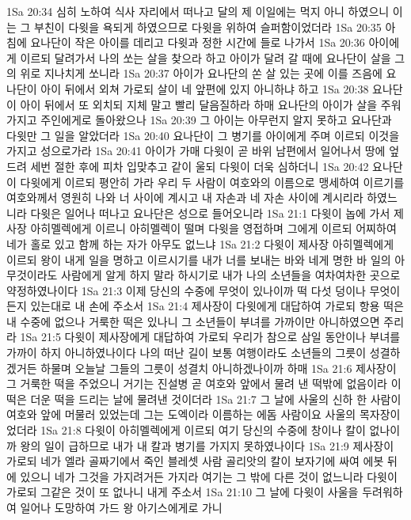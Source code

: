 1Sa 20:34  심히 노하여 식사 자리에서 떠나고 달의 제 이일에는 먹지 아니 하였으니 이는 그 부친이 다윗을 욕되게 하였으므로 다윗을 위하여 슬퍼함이었더라
1Sa 20:35  아침에 요나단이 작은 아이를 데리고 다윗과 정한 시간에 들로 나가서
1Sa 20:36  아이에게 이르되 달려가서 나의 쏘는 살을 찾으라 하고 아이가 달려 갈 때에 요나단이 살을 그의 위로 지나치게 쏘니라
1Sa 20:37  아이가 요나단의 쏜 살 있는 곳에 이를 즈음에 요나단이 아이 뒤에서 외쳐 가로되 살이 네 앞편에 있지 아니하냐 하고
1Sa 20:38  요나단이 아이 뒤에서 또 외치되 지체 말고 빨리 달음질하라 하매 요나단의 아이가 살을 주워가지고 주인에게로 돌아왔으나
1Sa 20:39  그 아이는 아무런지 알지 못하고 요나단과 다윗만 그 일을 알았더라
1Sa 20:40  요나단이 그 병기를 아이에게 주며 이르되 이것을 가지고 성으로가라
1Sa 20:41  아이가 가매 다윗이 곧 바위 남편에서 일어나서 땅에 엎드려 세번 절한 후에 피차 입맞추고 같이 울되 다윗이 더욱 심하더니
1Sa 20:42  요나단이 다윗에게 이르되 평안히 가라 우리 두 사람이 여호와의 이름으로 맹세하여 이르기를 여호와께서 영원히 나와 너 사이에 계시고 내 자손과 네 자손 사이에 계시리라 하였느니라 다윗은 일어나 떠나고 요나단은 성으로 들어오니라
1Sa 21:1  다윗이 놉에 가서 제사장 아히멜렉에게 이르니 아히멜렉이 떨며 다윗을 영접하며 그에게 이르되 어찌하여 네가 홀로 있고 함께 하는 자가 아무도 없느냐
1Sa 21:2  다윗이 제사장 아히멜렉에게 이르되 왕이 내게 일을 명하고 이르시기를 내가 너를 보내는 바와 네게 명한 바 일의 아무것이라도 사람에게 알게 하지 말라 하시기로 내가 나의 소년들을 여차여차한 곳으로 약정하였나이다
1Sa 21:3  이제 당신의 수중에 무엇이 있나이까 떡 다섯 덩이나 무엇이든지 있는대로 내 손에 주소서
1Sa 21:4  제사장이 다윗에게 대답하여 가로되 항용 떡은 내 수중에 없으나 거룩한 떡은 있나니 그 소년들이 부녀를 가까이만 아니하였으면 주리라
1Sa 21:5  다윗이 제사장에게 대답하여 가로되 우리가 참으로 삼일 동안이나 부녀를 가까이 하지 아니하였나이다 나의 떠난 길이 보통 여행이라도 소년들의 그릇이 성결하겠거든 하물며 오늘날 그들의 그릇이 성결치 아니하겠나이까 하매
1Sa 21:6  제사장이 그 거룩한 떡을 주었으니 거기는 진설병 곧 여호와 앞에서 물려 낸 떡밖에 없음이라 이 떡은 더운 떡을 드리는 날에 물려낸 것이더라
1Sa 21:7  그 날에 사울의 신하 한 사람이 여호와 앞에 머물러 있었는데 그는 도엑이라 이름하는 에돔 사람이요 사울의 목자장이었더라
1Sa 21:8  다윗이 아히멜렉에게 이르되 여기 당신의 수중에 창이나 칼이 없나이까 왕의 일이 급하므로 내가 내 칼과 병기를 가지지 못하였나이다
1Sa 21:9  제사장이 가로되 네가 엘라 골짜기에서 죽인 블레셋 사람 골리앗의 칼이 보자기에 싸여 에봇 뒤에 있으니 네가 그것을 가지려거든 가지라 여기는 그 밖에 다른 것이 없느니라 다윗이 가로되 그같은 것이 또 없나니 내게 주소서
1Sa 21:10  그 날에 다윗이 사울을 두려워하여 일어나 도망하여 가드 왕 아기스에게로 가니
